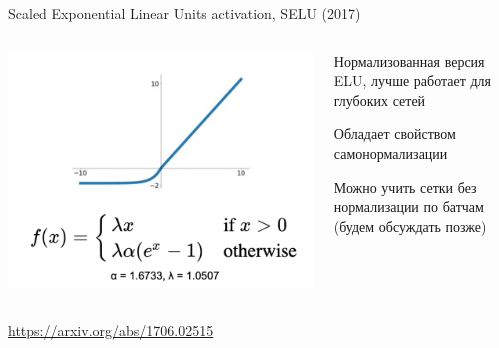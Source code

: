 \documentclass[notes,12pt, aspectratio=169]{beamer}
\newenvironment{wideitemize}{\itemize\addtolength{\itemsep}{10pt}}{\enditemize}
\begin{document}
\begin{frame}{Scaled Exponential Linear Units activation, SELU (2017)}
\begin{columns}
	\begin{column}{0.45\textwidth}
		\begin{center}
			\includegraphics[width=.99\linewidth]{selu.png}
		\end{center}
	\end{column}
	\hfill
	\begin{column}{0.55\textwidth}
		\begin{wideitemize} 
				\item  Нормализованная версия ELU, лучше работает для глубоких сетей
				\item  Обладает свойством самонормализации
				\item  Можно учить сетки без нормализации по батчам (будем обсуждать позже)
		\end{wideitemize}
	\end{column}
\end{columns}
\vfill %
\footnotesize
{\color{blue} \url{https://arxiv.org/abs/1706.02515}}
\end{frame}
\end{document}
